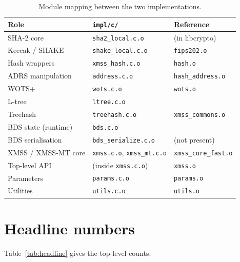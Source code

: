 \documentclass[11pt,a4paper]{article}
\begin{document}
\begin{table}[ht]
\centering
\caption{Module mapping between the two implementations.}
\label{tab:mapping}
\begin{tabularx}{\linewidth}{@{}XXX@{}}
\toprule
Role & \texttt{impl/c/} & Reference \\
\midrule
SHA-2 core          & \texttt{sha2\_local.c.o}       & (in libcrypto) \\
Keccak / SHAKE      & \texttt{shake\_local.c.o}      & \texttt{fips202.o} \\
Hash wrappers       & \texttt{xmss\_hash.c.o}        & \texttt{hash.o} \\
ADRS manipulation   & \texttt{address.c.o}           & \texttt{hash\_address.o} \\
WOTS+               & \texttt{wots.c.o}              & \texttt{wots.o} \\
L-tree              & \texttt{ltree.c.o}             & \multirow{3}{\linewidth}{\texttt{xmss\_commons.o}} \\
Treehash            & \texttt{treehash.c.o}          & \\
BDS state (runtime) & \texttt{bds.c.o}               & \\
BDS serialisation   & \texttt{bds\_serialize.c.o}    & (not present) \\
XMSS / XMSS-MT core & \texttt{xmss.c.o}, \texttt{xmss\_mt.c.o} & \texttt{xmss\_core\_fast.o} \\
Top-level API       & (inside \texttt{xmss.c.o})     & \texttt{xmss.o} \\
Parameters          & \texttt{params.c.o}            & \texttt{params.o} \\
Utilities           & \texttt{utils.c.o}             & \texttt{utils.o} \\
\bottomrule
\end{tabularx}
\end{table}

\section{Headline numbers}

Table~\ref{tab:headline} gives the top-level counts.
\end{document}
